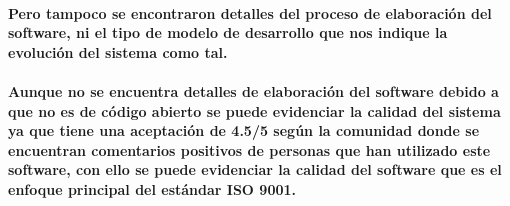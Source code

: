 \documentclass[12pt,a4paper]{article}
\begin{document}
\paragraph{Pero tampoco se encontraron detalles del proceso de elaboración del software, ni el tipo de modelo de desarrollo que nos indique la evolución del sistema como tal.}
\paragraph{Aunque no se encuentra detalles de elaboración del software debido a que no es de código abierto se puede evidenciar la calidad del sistema ya que tiene una aceptación de 4.5/5 según la comunidad donde se encuentran comentarios positivos de personas que han utilizado este software, con ello se puede evidenciar la calidad del software que es el enfoque principal del estándar ISO 9001.}
\end{document}
